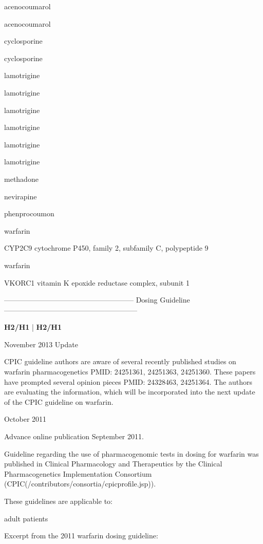 \documentclass{resume} %
\begin{document}
\begin{rSection}{ acenocoumarol }
\begin{rSection}{ acenocoumarol }
\begin{rSection}{ cyclosporine }
\begin{rSection}{ cyclosporine }
\begin{rSection}{ lamotrigine }
\begin{rSection}{ lamotrigine }
\begin{rSection}{ lamotrigine }
\begin{rSection}{ lamotrigine }
\begin{rSection}{ lamotrigine }
\begin{rSection}{ lamotrigine }
\begin{rSection}{ methadone }
\begin{rSection}{ nevirapine }
\begin{rSection}{ phenprocoumon }
\begin{rSection}{ warfarin }
\begin{rSubsection}{ CYP2C9 }{ cytochrome P450, family 2, subfamily C, polypeptide 9 }{}{}
\end{rSubsection}
\begin{rSection}{ warfarin }
\item[]
\begin{rSubsection}{ VKORC1 }{ vitamin K epoxide reductase complex, subunit 1 }{}{}
\item[]
\item[] ------------------------------------------------------ Dosing Guideline --------------------------------------------------------\newline
\item[]
\item[] \textbf{ H2/H1 } | \textbf{ H2/H1 }
\item November 2013 Update
 \newline
\item CPIC guideline authors are aware of several recently published studies on warfarin pharmacogenetics PMID: 24251361, 24251363, 24251360. These papers have prompted several opinion pieces PMID: 24328463, 24251364. The authors are evaluating the information, which will be incorporated into the next update of the CPIC guideline on warfarin.
 \newline
\item October 2011
 \newline
\item Advance online publication September 2011. 
 \newline
\item Guideline regarding the use of pharmacogenomic tests in dosing for warfarin was published in Clinical Pharmacology and Therapeutics by the Clinical Pharmacogenetics Implementation Consortium (CPIC(/contributors/consortia/cpicprofile.jsp)).  
 \newline
\item These guidelines are applicable to:
 \newline
\item adult patients
 \newline
\item Excerpt from the 2011 warfarin dosing guideline:
 \newline

\end{rSubsection}
\end{rSection}
\end{rSection}
\end{rSection}
\end{rSection}
\end{rSection}
\end{rSection}
\end{rSection}
\end{rSection}
\end{rSection}
\end{rSection}
\end{rSection}
\end{rSection}
\end{rSection}
\end{rSection}
\end{rSection}
\end{document}
